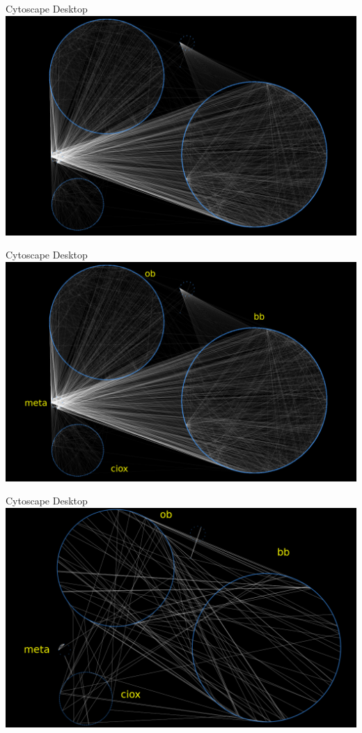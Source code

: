 \documentclass[14pt,aspectratio=1610]{beamer}
\begin{document}
\begin{frame}{Cytoscape Desktop}
\centering\includegraphics[width=\textwidth,height=\textheight,keepaspectratio]{img/types_classrelations.png}
\end{frame}

\begin{frame}{Cytoscape Desktop}
\centering\includegraphics[width=\textwidth,height=\textheight,keepaspectratio]{img/types_classrelations_labelled.png}
\end{frame}

\begin{frame}{Cytoscape Desktop}
\centering\includegraphics[width=\textwidth,height=\textheight,keepaspectratio]{img/types_classrelations_nosubclass_labelled.png}
\end{frame}
\end{document}
